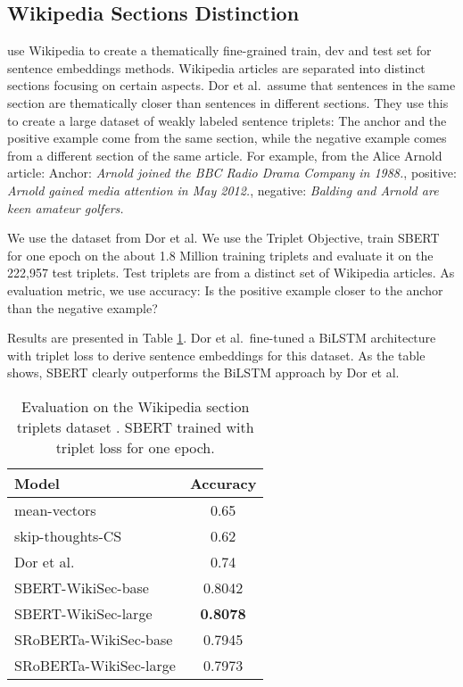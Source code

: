 \documentclass[11pt,a4paper]{article}
\begin{document}
\subsection{Wikipedia Sections Distinction}
 use Wikipedia to create a thematically fine-grained train, dev and test set for sentence embeddings methods. Wikipedia articles are separated into distinct sections focusing on certain aspects. Dor et al.\ assume that sentences in the same section are thematically closer than sentences in different sections. They use this to create a large dataset of weakly labeled sentence triplets: The anchor and the positive example come from the same section, while the negative example comes from a different section of the same article. For example, from the Alice Arnold article: Anchor: \textit{Arnold joined the BBC Radio Drama Company in 1988.}, positive: \textit{Arnold gained media attention in May 2012.}, negative: \textit{Balding and Arnold are keen amateur golfers.}


We use the dataset from Dor et al. We use the Triplet Objective, train SBERT for one epoch on the about 1.8 Million training triplets and evaluate it on the 222,957 test triplets. Test triplets are from a distinct set of Wikipedia articles. As evaluation metric, we use accuracy: Is the positive example closer to the anchor than the negative example?

Results are presented in Table \ref{table_wikipedia_triplets}. Dor et al.\ fine-tuned a BiLSTM architecture with triplet loss to derive sentence embeddings for this dataset. As the table shows, SBERT clearly outperforms the BiLSTM approach by Dor et al.

\begin{table}[h]
	\centering 
	\footnotesize
	\begin{tabular}{|l|c|}
		\hline
		\textbf{Model} & \textbf{Accuracy}  \\ \hline
		mean-vectors & 0.65 \\
		skip-thoughts-CS & 0.62 \\
		Dor et al.\ & 0.74 \\ \hline 
		SBERT-WikiSec-base & 0.8042 \\ 
		SBERT-WikiSec-large & \textbf{0.8078} \\ 
		SRoBERTa-WikiSec-base & 0.7945 \\
		SRoBERTa-WikiSec-large & 0.7973 \\ \hline
	\end{tabular}
	\caption{Evaluation on the Wikipedia section triplets dataset \cite{ein-dor-etal-2018-learning}. SBERT trained with triplet loss for one epoch.}
	\label{table_wikipedia_triplets}
\end{table}
\end{document}
